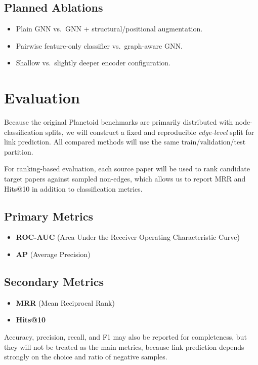 \documentclass[11pt,a4paper]{article}
\begin{document}
\subsection{Planned Ablations}
\begin{itemize}
    \item Plain GNN vs.\ GNN + structural/positional augmentation.
    \item Pairwise feature-only classifier vs.\ graph-aware GNN.
    \item Shallow vs.\ slightly deeper encoder configuration.
\end{itemize}

\section{Evaluation}

Because the original Planetoid benchmarks are primarily distributed with node-classification splits,
we will construct a fixed and reproducible \emph{edge-level} split for link prediction.
All compared methods will use the same train/validation/test partition.

For ranking-based evaluation, each source paper will be used to rank candidate target papers against sampled non-edges,
which allows us to report MRR and Hits@10 in addition to classification metrics.

\subsection{Primary Metrics}
\begin{itemize}
    \item \textbf{ROC-AUC} (Area Under the Receiver Operating Characteristic Curve)
    \item \textbf{AP} (Average Precision)
\end{itemize}

\subsection{Secondary Metrics}
\begin{itemize}
    \item \textbf{MRR} (Mean Reciprocal Rank)
    \item \textbf{Hits@10}
\end{itemize}

Accuracy, precision, recall, and F1 may also be reported for completeness,
but they will not be treated as the main metrics,
because link prediction depends strongly on the choice and ratio of negative samples.
\end{document}
